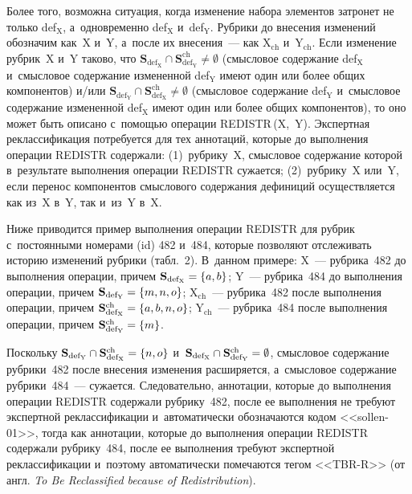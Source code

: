 \begin{multicols}{2}
Более того, возможна ситуация, когда изменение набора элементов затронет 
не только def$_{\mathrm{X}}$, а~одновременно def$_{\mathrm{X}}$ 
и~def$_{\mathrm{Y}}$. Рубрики до внесения изменений обозначим как~X 
и~Y, а~после их внесения~--- как X$_{\mathrm{ch}}$ и~Y$_{\mathrm{ch}}$. 
Если изменение руб\-рик~X и~Y таково, что  $\mathbf{S}_{\mathrm{def_X}} 
\cap \mathbf{S}_{\mathrm{def_Y}}^{\mathrm{ch}}\not= \emptyset$ 
(смысловое содержание def$_{\mathrm{X}}$ и~смысловое содержание 
измененной def$_{\mathrm{Y}}$ имеют один или более общих компонентов) 
и/или $\mathbf{S}_{\mathrm{def_Y}} \cap 
\mathbf{S}_{\mathrm{def_X}}^{\mathrm{ch}}\not= \emptyset$ (смысловое 
содержание def$_{\mathrm{Y}}$ и~смысловое содержание измененной 
def$_{\mathrm{X}}$ имеют один или более общих компонентов), то оно может 
быть описано с~по\-мощью операции \mbox{REDISTR\,(X, Y)}. Экспертная 
реклассификация потребуется для тех аннотаций, которые до выполнения 
операции REDISTR содержали: (1)~руб\-ри\-ку~X, смысловое содержание 
которой в~результате выполнения операции REDISTR сужается;  
(2)~руб\-ри\-ку~X или~Y, если перенос компонентов смыслового содержания 
дефиниций осуществляется как из~X в~Y, так и~из~Y в~X.


Ниже приводится пример выполнения операции REDISTR для рубрик 
с~постоянными номерами (id) 482 и~484, которые позволяют отслеживать 
историю изменений рубрики (табл.~2). В~данном примере: X~---  
руб\-ри\-ка~482 до выполнения операции, причем 
$\mathbf{S}_{\mathrm{def_X}}\hm= \{a, b\}$; Y~--- руб\-ри\-ка~484 до 
выполнения операции, причем $\mathbf{S}_{\mathrm{def_Y}}\hm= 
\{m,n,o\}$; X$_{\mathrm{ch}}$~--- руб\-ри\-ка~482 после выполнения операции, 
причем $\mathbf{S}_{\mathrm{def_X}}^{\mathrm{ch}}\hm= \{a, b, n, o\}$; 
Y$_{\mathrm{ch}}$~--- руб\-ри\-ка~484 после выполнения операции, причем 
$\mathbf{S}_{\mathrm{def_Y}}^{\mathrm{ch}}\hm=\{m\}$.


Поскольку $\mathbf{S}_{\mathrm{def_Y}}\cap 
\mathbf{S}_{\mathrm{def_X}}^{\mathrm{ch}}\hm=\{n, o\}$ 
и~$\mathbf{S}_{\mathrm{def_X}}\cap 
\mathbf{S}_{\mathrm{def_Y}}^{\mathrm{ch}}\hm=\emptyset$, смысловое 
содержание руб\-ри\-ки~482 после внесения изменения расширяется, 
а~смысловое содержание руб\-ри\-ки~484~--- сужается. Следовательно,\linebreak 
аннотации, которые до выполнения операции \mbox{REDISTR} содержали 
 руб\-ри\-ку~482, после ее выполнения не требуют экспертной 
реклассификации и~автоматически обозначаются кодом <<sollen-01>>, тогда 
как аннотации, которые до выполнения операции REDISTR содержали  
руб\-ри\-ку~484, после ее выполнения требуют экспертной реклассификации 
и~поэтому автоматически помечаются тегом <<\mbox{TBR-R}>> (от англ. \textit{To 
Be Reclassified because of Redistribution}).


\end{multicols}
